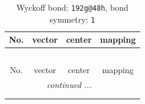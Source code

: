 \documentclass[fleqn,8pt]{jsarticle}
\begin{document}
\renewcommand{\arraystretch}{1.2}
\begin{longtable}{cccc}
\caption{Wyckoff bond: {\tt 192g@48h}, bond symmetry: {\tt 1}}
 \\
 \hline \hline
No. & vector & center & mapping \\ \hline \endfirsthead

\multicolumn{3}{l}{\tablename\ \thetable{}} \\
 \hline \hline
No. & vector & center & mapping \\ \hline \endhead

 \hline \hline
\multicolumn{3}{r}{\footnotesize\it continued ...} \\ \endfoot

 \hline \hline
\multicolumn{3}{r}{} \\ \endlastfoot


\end{longtable}
\end{document}
